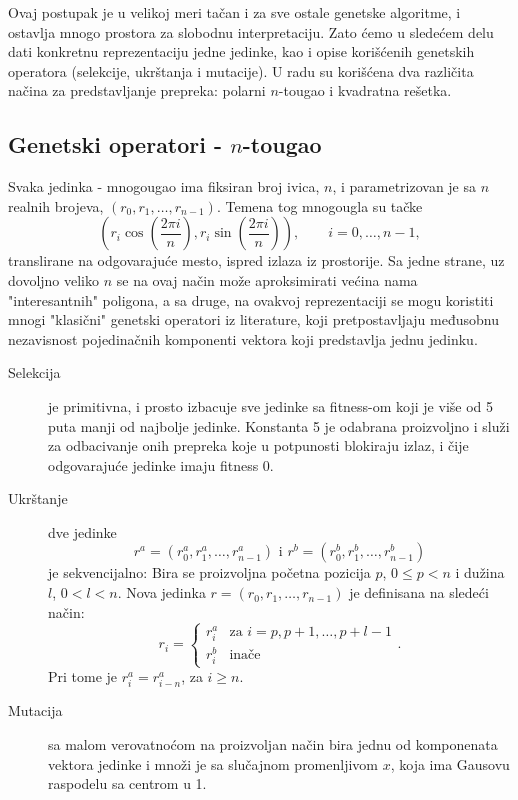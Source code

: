 \documentclass[12pt]{article}
\begin{document}
Ovaj postupak je u velikoj meri tačan i za sve ostale genetske algoritme, i ostavlja mnogo prostora za slobodnu interpretaciju. Zato ćemo u sledećem delu dati konkretnu reprezentaciju jedne jedinke, kao i opise korišćenih genetskih operatora (selekcije, ukrštanja i mutacije). U radu su korišćena dva različita načina za predstavljanje prepreka: polarni $n$-tougao i kvadratna rešetka.

\subsection{Genetski operatori - $n$-tougao}

Svaka jedinka - mnogougao ima fiksiran broj ivica, $n$, i parametrizovan je sa $n$ realnih brojeva, $(r_0, r_1, \dots, r_{n-1})$. Temena tog mnogougla su tačke
$$\left(r_i \cos\left(\frac{2\pi i}{n}\right), r_i \sin\left(\frac{2\pi i}{n}\right)\right), \qquad i=0,\dots,n-1,$$
translirane na odgovarajuće mesto, ispred izlaza iz prostorije. Sa jedne strane, uz dovoljno veliko $n$ se na ovaj način može aproksimirati većina nama "interesantnih" poligona, a sa druge, na ovakvoj reprezentaciji se mogu koristiti mnogi "klasični" genetski operatori iz literature, koji pretpostavljaju međusobnu nezavisnost pojedinačnih komponenti vektora koji predstavlja jednu jedinku.

\begin{description}
\item[Selekcija] je primitivna, i prosto izbacuje sve jedinke sa fitness-om koji je više od 5 puta manji od najbolje jedinke. Konstanta 5 je odabrana proizvoljno i služi za odbacivanje onih prepreka koje u potpunosti blokiraju izlaz, i čije odgovarajuće jedinke imaju fitness 0.
\item[Ukrštanje] dve jedinke 
$$r^a = (r^a_0, r^a_1, \dots, r^a_{n-1}) \text{ i } r^b=(r^b_0, r^b_1, \dots, r^b_{n-1})$$ je sekvencijalno: Bira se proizvoljna početna pozicija $p$, $0\leq p < n$ i dužina $l$, $0 < l < n $. Nova jedinka $r = (r_0, r_1, \dots, r_{n-1})$ je definisana na sledeći način:
$$
r_i = 
\begin{cases}
    r^a_i & \text{za } i=p, p+1, \dots, p+l-1\\
    r^b_i & \text{inače}
\end{cases}.
$$
Pri tome je $r^a_i = r^a_{i-n}$, za $i\geq n$.
\item[Mutacija] sa malom verovatnoćom na proizvoljan način bira jednu od komponenata vektora jedinke i množi je sa slučajnom promenljivom $x$, koja ima Gausovu raspodelu sa centrom u 1.
\end{description}
\end{document}
